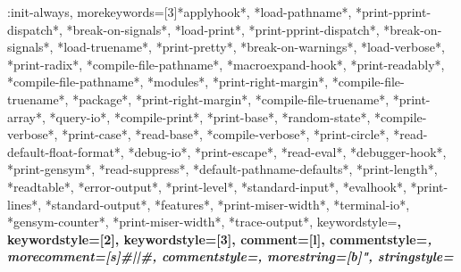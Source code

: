 {{    :init-always},
    morekeywords=[3]{*applyhook*, *load-pathname*, *print-pprint-dispatch*, 
        *break-on-signals*, *load-print*, *print-pprint-dispatch*, 
        *break-on-signals*, *load-truename*, *print-pretty*, 
        *break-on-warnings*, *load-verbose*, *print-radix*, 
        *compile-file-pathname*, *macroexpand-hook*, *print-readably*, 
        *compile-file-pathname*, *modules*, *print-right-margin*, 
        *compile-file-truename*, *package*, *print-right-margin*, 
        *compile-file-truename*, *print-array*, *query-io*, 
        *compile-print*, *print-base*, *random-state*, 
        *compile-verbose*, *print-case*, *read-base*, 
        *compile-verbose*, *print-circle*, *read-default-float-format*, 
        *debug-io*, *print-escape*, *read-eval*, 
        *debugger-hook*, *print-gensym*, *read-suppress*, 
        *default-pathname-defaults*, *print-length*, *readtable*, 
        *error-output*, *print-level*, *standard-input*, 
        *evalhook*, *print-lines*, *standard-output*, 
        *features*, *print-miser-width*, *terminal-io*, 
    *gensym-counter*, *print-miser-width*, *trace-output*},
    keywordstyle=\bfseries\color{lisp@func},%
    keywordstyle=[2]{\bfseries\color{lisp@key}},%
    keywordstyle=[3]{\bfseries\color{lisp@var}},%
    comment=[l]{\;}, %
    commentstyle=\it\small\color{lisp@comm},%
    morecomment=[s]{\#|}{|\#}, %
    commentstyle=\it\small\color{lisp@comm},%
    morestring=[b]",%
    stringstyle=\color{lisp@string}%
}

\fi
